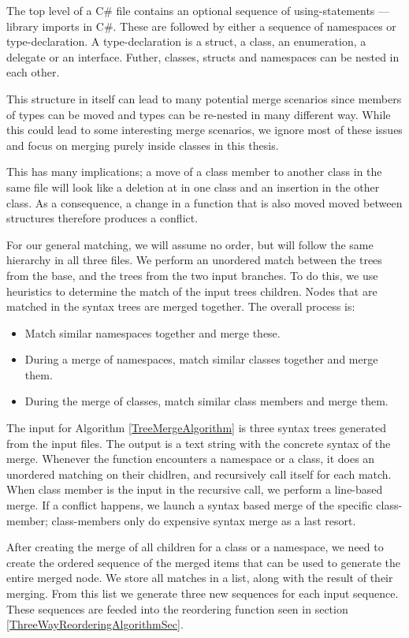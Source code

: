 \documentclass[11pt]{article}
\begin{document}
The top level of a C\# file contains an optional sequence of using-statements --- library imports in C\#. These are followed by either a sequence of namespaces or type-declaration. A type-declaration is a struct, a class, an enumeration, a delegate or an interface. Futher, classes, structs and namespaces can be nested in each other.

This structure in itself can lead to many potential merge scenarios since members of types can be moved and types can be re-nested in many different way. While this could lead to some interesting merge scenarios, we ignore most of these issues and focus on merging purely inside classes in this thesis.

This has many implications; a move of a class member to another class in the same file will look like a deletion at in one class and an insertion in the other class. As a consequence, a change in a function that is also moved moved between structures therefore produces a conflict.

For our general matching, we will assume no order, but will follow the same hierarchy in all three files. We perform an unordered match between the trees from the base, and the trees from the two input branches. To do this, we use heuristics to determine the match of the input trees children. Nodes that are matched in the syntax trees are merged together. The overall process is:

\begin{itemize}
   \item Match similar namespaces together and merge these.
   \item During a merge of namespaces, match similar classes together and merge them.
   \item During the merge of classes, match similar class members and merge them.
\end{itemize}

The input for Algorithm \ref{TreeMergeAlgorithm} is three syntax trees generated from the input files. The output is a text string with the concrete syntax of the merge. Whenever the function encounters a namespace or a class, it does an unordered matching on their chidlren, and recursively call itself for each match. When class member is the input in the recursive call, we perform a line-based merge. If a conflict happens, we launch a syntax based merge of the specific class-member; class-members only do expensive syntax merge as a last resort.

After creating the merge of all children for a class or a namespace, we need to create the ordered sequence of the merged items that can be used to generate the entire merged node. We store all matches in a list, along with the result of their merging. From this list we generate three new sequences for each input sequence. These sequences are feeded into the reordering function seen in section \ref{ThreeWayReorderingAlgorithmSec}.
\end{document}
